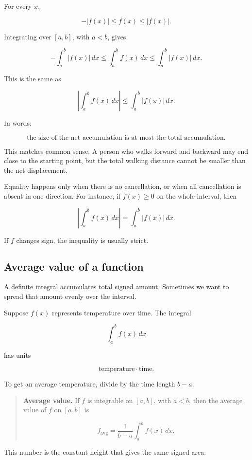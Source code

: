 For every \(x\),

\[
-|f(x)|\le f(x)\le |f(x)|.
\]

Integrating over \([a,b]\), with \(a<b\), gives

\[
-\int_a^b |f(x)|\,dx
\le
\int_a^b f(x)\,dx
\le
\int_a^b |f(x)|\,dx.
\]

This is the same as

\[
\boxed{
\left|\int_a^b f(x)\,dx\right|
\le
\int_a^b |f(x)|\,dx.
}
\]

In words:

\[
\boxed{
\text{the size of the net accumulation is at most the total accumulation.}
}
\]

This matches common sense.  A person who walks forward and backward may end close to
the starting point, but the total walking distance cannot be smaller than the net
displacement.

Equality happens only when there is no cancellation, or when all cancellation is absent in
one direction.  For instance, if \(f(x)\ge0\) on the whole interval, then

\[
\left|\int_a^b f(x)\,dx\right|
=
\int_a^b |f(x)|\,dx.
\]

If \(f\) changes sign, the inequality is usually strict.

\subsection{Average value of a function}
\label{subsec:average-value-function}

A definite integral accumulates total signed amount.  Sometimes we want to spread that
amount evenly over the interval.

Suppose \(f(x)\) represents temperature over time.  The integral

\[
\int_a^b f(x)\,dx
\]

has units

\[
\text{temperature}\cdot\text{time}.
\]

To get an average temperature, divide by the time length \(b-a\).

\begin{quote}
\textbf{Average value.}
If \(f\) is integrable on \([a,b]\), with \(a<b\), then the average value of \(f\) on
\([a,b]\) is

\[
\boxed{
f_{\text{avg}}
=
\frac{1}{b-a}\int_a^b f(x)\,dx.
}
\]
\end{quote}

This number is the constant height that gives the same signed area:

